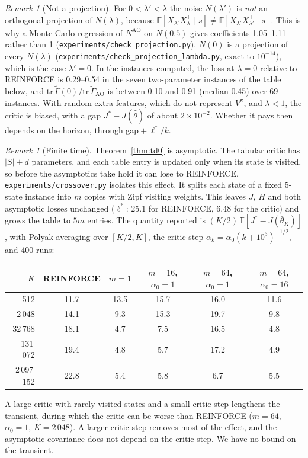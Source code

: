 \documentclass[11pt]{article}
\theoremstyle{definition}
\theoremstyle{remark}
\newtheorem{remark}[theorem]{Remark}
\newcommand{\E}{\mathbb{E}}
\begin{document}
\begin{remark}[Not a projection]
For $0 < \lambda' < \lambda$ the noise $N(\lambda')$ is \emph{not} an orthogonal projection of $N(\lambda)$, because
$\E[X_{\lambda'}X_\lambda^\top\mid s] \ne \E[X_{\lambda'}X_{\lambda'}^\top\mid s]$. This is why a Monte Carlo
regression of $N^{\text{AO}}$ on $N(0.5)$ gives coefficients 1.05--1.11 rather than 1
(\texttt{experiments/check\_projection.py}). $N(0)$ is a projection of every $N(\lambda)$
(\texttt{experiments/check\_projection\_lambda.py}, exact to $10^{-14}$), which is the case $\lambda' = 0$.
In the instances computed, the loss at $\lambda = 0$ relative to REINFORCE is 0.29--0.54 in the seven
two-parameter instances of the table below, and $\mathrm{tr}\,\tilde\Gamma(0)/\mathrm{tr}\,\tilde\Gamma_{\text{AO}}$ is
between 0.10 and 0.91 (median 0.45) over 69 instances. With random extra features, which do not
represent $V^\pi$, and $\lambda < 1$, the critic is biased, with a gap $J^* - J(\hat\theta)$ of about
$2\times10^{-2}$. Whether it pays then depends on the horizon, through gap${}+\ell^*/k$.
\end{remark}

\begin{remark}[Finite time]\label{rem:finite}
Theorem~\ref{thm:td0} is asymptotic. The tabular critic has $|S| + d$ parameters, and each table
entry is updated only when its state is visited, so before the asymptotics take hold it can lose
to REINFORCE. \texttt{experiments/crossover.py} isolates this effect. It splits each state of a
fixed 5-state instance into $m$ copies with Zipf visiting weights. This leaves $J$, $H$ and both
asymptotic losses unchanged ($\ell^*$: 25.1 for REINFORCE, 6.48 for the critic) and grows the
table to $5m$ entries. The quantity reported is $(K/2)\,\E[J^* - J(\bar\theta_K)]$, with Polyak
averaging over $[K/2, K]$, the critic step $\alpha_k = \alpha_0(k + 10^3)^{-1/2}$, and 400 runs:
\begin{center}
\begin{tabular}{r ccccc}
\toprule
$K$ & REINFORCE & $m = 1$ & $m = 16$, $\alpha_0 = 1$ & $m = 64$, $\alpha_0 = 1$ & $m = 64$, $\alpha_0 = 16$ \\
\midrule
512 & 11.7 & 13.5 & 15.7 & 16.0 & 11.6 \\
2\,048 & 14.1 & 9.3 & 15.3 & 19.7 & 9.8 \\
32\,768 & 18.1 & 4.7 & 7.5 & 16.5 & 4.8 \\
131\,072 & 19.4 & 4.8 & 5.7 & 17.2 & 4.9 \\
2\,097\,152 & 22.8 & 5.4 & 5.8 & 6.7 & 5.5 \\
\bottomrule
\end{tabular}
\end{center}
A large critic with rarely visited states and a small critic step lengthens the transient, during
which the critic can be worse than REINFORCE ($m = 64$, $\alpha_0 = 1$, $K = 2\,048$). A larger critic
step removes most of the effect, and the asymptotic covariance does not depend on the critic step.
We have no bound on the transient.
\end{remark}
\end{document}
